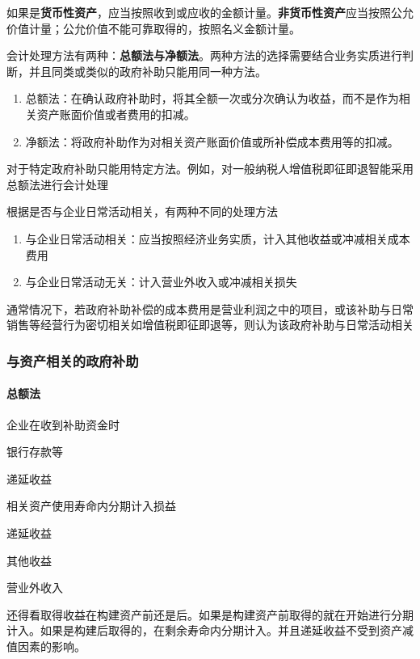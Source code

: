 \documentclass[UTF8,12pt]{ctexart}
\newenvironment{Dr}{%
	\begin{list}{}%
		{
			\setlength{\leftmargin}{2em}
			\setlength{\labelwidth}{2em}
			\setlength{\labelsep}{0pt}
			\setlength{\itemindent}{0pt}
			\setlength{\listparindent}{0pt}
			\setlength{\parsep}{0pt}
			\setlength{\topsep}{0pt}
		}
		\item[\textbf{借：}]
	}{%
	\end{list}
}
\newenvironment{Cr}{%
	\begin{list}{}%
		{
			\setlength{\leftmargin}{2em}
			\setlength{\labelwidth}{2em}
			\setlength{\labelsep}{0pt}
			\setlength{\itemindent}{0pt}
			\setlength{\listparindent}{0pt}
			\setlength{\parsep}{0pt}
			\setlength{\topsep}{0pt}
		}
		\item[\textbf{贷：}]
	}{%
	\end{list}
}
\numberwithin{equation}{section} %
\numberwithin{figure}{section}
\numberwithin{table}{section}
\begin{document}
	如果是\textbf{货币性资产}，应当按照收到或应收的金额计量。\textbf{非货币性资产}应当按照公允价值计量；公允价值不能可靠取得的，按照名义金额计量。
	
	会计处理方法有两种：\textbf{总额法与净额法}。两种方法的选择需要结合业务实质进行判断，并且同类或类似的政府补助只能用同一种方法。
	\begin{enumerate}
		\item 总额法：在确认政府补助时，将其全额一次或分次确认为收益，而不是作为相关资产账面价值或者费用的扣减。
		
		\item 净额法：将政府补助作为对相关资产账面价值或所补偿成本费用等的扣减。
	\end{enumerate}
	
	对于特定政府补助只能用特定方法。例如，对一般纳税人增值税即征即退智能采用总额法进行会计处理
	
	根据是否与企业日常活动相关，有两种不同的处理方法
	\begin{enumerate}
		\item 与企业日常活动相关：应当按照经济业务实质，计入其他收益或冲减相关成本费用
		
		\item 与企业日常活动无关：计入营业外收入或冲减相关损失
	\end{enumerate}
	通常情况下，若政府补助补偿的成本费用是营业利润之中的项目，或该补助与日常销售等经营行为密切相关如增值税即征即退等，则认为该政府补助与日常活动相关
	
	\subsubsection{与资产相关的政府补助}
	\paragraph{总额法}
	
	企业在收到补助资金时
	\begin{Dr}
		银行存款等
	\end{Dr}
	\begin{Cr}
		递延收益
	\end{Cr}

	相关资产使用寿命内分期计入损益
	\begin{Dr}
		递延收益
	\end{Dr}
	\begin{Cr}
		其他收益
		
		营业外收入
	\end{Cr}
	
	还得看取得收益在构建资产前还是后。如果是构建资产前取得的就在开始进行分期计入。如果是构建后取得的，在剩余寿命内分期计入。并且递延收益不受到资产减值因素的影响。
	
\end{document}

